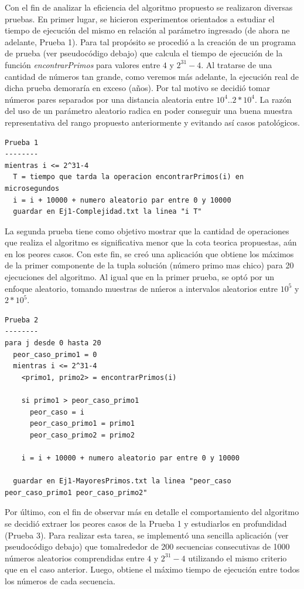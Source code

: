 \documentclass[a4paper,10pt] {article}
\begin{document}
Con el fin de analizar la eficiencia del algoritmo propuesto se realizaron diversas pruebas. En primer lugar, se hicieron experimentos orientados a estudiar el tiempo de ejecuci\'on del mismo en relaci\'on al par\'ametro ingresado (de ahora ne adelante, Prueba 1). Para tal prop\'osito se procedi\'o a la creaci\'on de un programa de prueba (ver pseudoc\'odigo debajo) que calcula el tiempo de ejecuci\'on de la funci\'on \textit{encontrarPrimos} para valores entre $4$ y $2^{31}-4$. Al tratarse de una cantidad de n\'umeros tan grande, como veremos m\'as adelante, la ejecuci\'on real de dicha prueba demorar\'ia en exceso (a\~{n}os). Por tal motivo se decidi\'o tomar n\'umeros pares separados por una distancia aleatoria entre $10^{4}..2*10^{4}$. La raz\'on del uso de un par\'ametro aleatorio radica en poder conseguir una buena muestra representativa del rango propuesto anteriormente y evitando as\'i casos patol\'ogicos.

\begin{verbatim}
Prueba 1
--------
mientras i <= 2^31-4
  T = tiempo que tarda la operacion encontrarPrimos(i) en microsegundos
  i = i + 10000 + numero aleatorio par entre 0 y 10000
  guardar en Ej1-Complejidad.txt la linea "i T"
\end{verbatim}

La segunda prueba tiene como objetivo mostrar que la cantidad de operaciones que realiza el algoritmo es significativa menor que la cota teorica propuestas, a\'un en los peores casos. Con este fin, se cre\'o una aplicaci\'on que obtiene los m\'aximos de la primer componente de la tupla soluci\'on (n\'umero primo mas chico) para 20 ejecuciones del algoritmo. Al igual que en la primer prueba, se opt\'o por un enfoque aleatorio, tomando muestras de n\'meros a intervalos aleatorios entre $10^{5}$ y $2*10^{5}$.

\begin{verbatim}
Prueba 2
--------
para j desde 0 hasta 20
  peor_caso_primo1 = 0
  mientras i <= 2^31-4
    <primo1, primo2> = encontrarPrimos(i)

    si primo1 > peor_caso_primo1
      peor_caso = i
      peor_caso_primo1 = primo1
      peor_caso_primo2 = primo2

    i = i + 10000 + numero aleatorio par entre 0 y 10000

  guardar en Ej1-MayoresPrimos.txt la linea "peor_caso peor_caso_primo1 peor_caso_primo2"
\end{verbatim}

Por \'ultimo, con el fin de observar m\'as en detalle el comportamiento del algoritmo se decidi\'o extraer los peores casos de la Prueba 1 y estudiarlos en profundidad (Prueba 3). Para realizar esta tarea, se implement\'o una sencilla aplicaci\'on (ver pseudoc\'odigo debajo) que tomalrededor de 200 secuencias consecutivas de 1000 n\'umeros aleatorios comprendidas entre $4$ y $2^{31}-4$ utilizando el mismo criterio que en el caso anterior. Luego, obtiene el m\'aximo tiempo de ejecuci\'on entre todos los n\'umeros de cada secuencia. 
\end{document}
